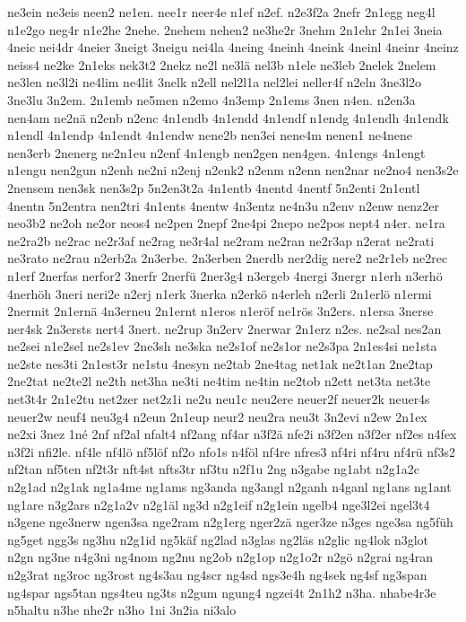 {ne3ein
ne3eis
neen2
ne1en.
nee1r
neer4e
n1ef
n2ef.
n2e3f2a
2nefr
2n1egg
neg4l
n1e2go
neg4r
n1e2he
2nehe.
2nehem
nehen2
ne3he2r
3nehm
2n1ehr
2n1ei
3neia
4neic
nei4dr
4neier
3neigt
3neigu
nei4la
4neing
4neinh
4neink
4neinl
4neinr
4neinz
neiss4
ne2ke
2n1eks
nek3t2
2nekz
ne2l
ne3lä
nel3b
n1ele
ne3leb
2nelek
2nelem
ne3len
ne3l2i
ne4lim
ne4lit
3nelk
n2ell
nel2l1a
nel2lei
neller4f
n2eln
3ne3l2o
3ne3lu
3n2em.
2n1emb
ne5men
n2emo
4n3emp
2n1ems
3nen
n4en.
n2en3a
nen4am
ne2nä
n2enb
n2enc
4n1endb
4n1endd
4n1endf
n1endg
4n1endh
4n1endk
n1endl
4n1endp
4n1endt
4n1endw
nene2b
nen3ei
nene4m
nenen1
ne4nene
nen3erb
2nenerg
ne2n1eu
n2enf
4n1engb
nen2gen
nen4gen.
4n1engs
4n1engt
n1engu
nen2gun
n2enh
ne2ni
n2enj
n2enk2
n2enm
n2enn
nen2nar
ne2no4
nen3s2e
2nensem
nen3sk
nen3s2p
5n2en3t2a
4n1entb
4nentd
4nentf
5n2enti
2n1entl
4nentn
5n2entra
nen2tri
4n1ents
4nentw
4n3entz
ne4n3u
n2env
n2enw
nenz2er
neo3b2
ne2oh
ne2or
neos4
ne2pen
2nepf
2ne4pi
2nepo
ne2pos
nept4
n4er.
ne1ra
ne2ra2b
ne2rac
ne2r3af
ne2rag
ne3r4al
ne2ram
ne2ran
ne2r3ap
n2erat
ne2rati
ne3rato
ne2rau
n2erb2a
2n3erbe.
2n3erben
2nerdb
ner2dig
nere2
ne2r1eb
ne2rec
n1erf
2nerfas
nerfor2
3nerfr
2nerfü
2ner3g4
n3ergeb
4nergi
3nergr
n1erh
n3erhö
4nerhöh
3neri
neri2e
n2erj
n1erk
3nerka
n2erkö
n4erleh
n2erli
2n1erlö
n1ermi
2nermit
2n1ernä
4n3erneu
2n1ernt
n1eros
n1eröf
ne1rös
3n2ers.
n1ersa
3nerse
ner4sk
2n3ersts
nert4
3nert.
ne2rup
3n2erv
2nerwar
2n1erz
n2es.
ne2sal
nes2an
ne2sei
n1e2sel
ne2s1ev
2ne3sh
ne3ska
ne2s1of
ne2s1or
ne2s3pa
2n1es4si
ne1sta
ne2ste
nes3ti
2n1est3r
ne1stu
4nesyn
ne2tab
2ne4tag
net1ak
ne2t1an
2ne2tap
2ne2tat
ne2te2l
ne2th
net3ha
ne3ti
ne4tim
ne4tin
ne2tob
n2ett
net3ta
net3te
net3t4r
2n1e2tu
net2zer
net2z1i
ne2u
neu1c
neu2ere
neuer2f
neuer2k
neuer4s
neuer2w
neuf4
neu3g4
n2eun
2n1eup
neur2
neu2ra
neu3t
3n2evi
n2ew
2n1ex
ne2xi
3nez
1né
2nf
nf2al
nfalt4
nf2ang
nf4ar
n3f2ä
nfe2i
n3f2en
n3f2er
nf2es
n4fex
n3f2i
nfi2le.
nf4le
nf4lö
nf5löf
nf2o
nfo1s
n4föl
nf4re
nfres3
nf4ri
nf4ru
nf4rü
nf3s2
nf2tan
nf5ten
nf2t3r
nft4st
nfts3tr
nf3tu
n2f1u
2ng
n3gabe
ng1abt
n2g1a2c
n2g1ad
n2g1ak
ng1a4me
ng1ams
ng3anda
ng3angl
n2ganh
n4ganl
ng1ans
ng1ant
ng1are
n3g2ars
n2g1a2v
n2g1äl
ng3d
n2g1eif
n2g1ein
ngelb4
nge3l2ei
ngel3t4
n3gene
nge3nerw
ngen3sa
nge2ram
n2g1erg
nger2zä
nger3ze
n3ges
nge3sa
ng5füh
ng5get
ngg3s
ng3hu
n2g1id
ng5käf
ng2lad
n3glas
ng2läs
n2glic
ng4lok
n3glot
n2gn
ng3ne
n4g3ni
ng4nom
ng2nu
ng2ob
n2g1op
n2g1o2r
n2gö
n2grai
ng4ran
n2g3rat
ng3roc
ng3rost
ng4s3au
ng4scr
ng4sd
ngs3e4h
ng4sek
ng4sf
ng3span
ng4spar
ngs5tan
ngs4teu
ng3ts
n2gum
ngung4
ngzei4t
2n1h2
n3ha.
nhabe4r3e
n5haltu
n3he
nhe2r
n3ho
1ni
3n2ia
ni3alo
}
